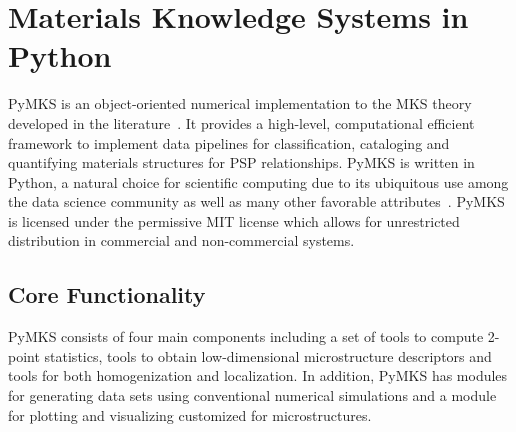 \documentclass{bmcart}
\begin{document}


\section{Materials Knowledge Systems in Python}

PyMKS is an object-oriented numerical implementation to the MKS theory
developed in the literature~\cite{kalidindi2010novel}. It provides a
high-level, computational efficient framework to implement data
pipelines for classification, cataloging and quantifying materials
structures for PSP relationships. PyMKS is written in Python, a
natural choice for scientific computing due to its ubiquitous use
among the data science community as well as many other favorable
attributes~\cite{perez2011python}. PyMKS is licensed under the
permissive MIT license \cite{MIT} which allows for unrestricted
distribution in commercial and non-commercial systems.

\subsection{Core Functionality}

PyMKS consists of four main components including a set of tools to
compute 2-point statistics, tools to obtain low-dimensional
microstructure descriptors and tools for both homogenization and
localization. In addition, PyMKS has modules for generating data sets
using conventional numerical simulations and a module for plotting and
visualizing customized for microstructures.
\end{document}
